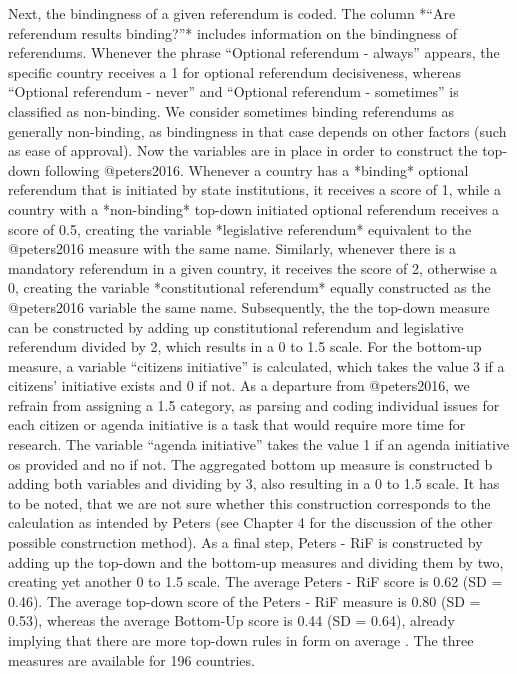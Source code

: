 \documentclass{systats}
\begin{document}
Next, the bindingness of a given referendum is coded. The column *“Are referendum results binding?”* includes information on the bindingness of referendums. Whenever the phrase “Optional referendum -  always” appears, the specific country receives a 1 for optional referendum decisiveness, whereas  “Optional referendum -  never” and “Optional referendum -  sometimes” is classified as non-binding. We consider sometimes binding referendums as generally non-binding, as bindingness in that case depends on other factors (such as ease of approval). Now the variables are in place in order to construct the top-down following @peters2016. Whenever a country has a *binding* optional referendum that is initiated by state institutions, it receives a score of 1, while a country with a *non-binding* top-down initiated optional referendum receives a score of 0.5, creating the variable *legislative referendum* equivalent to the @peters2016 measure with the same name. Similarly, whenever there is a mandatory referendum in a given country, it receives the score of 2, otherwise a 0, creating the variable *constitutional referendum*  equally constructed as the @peters2016 variable the same name. Subsequently, the the top-down measure can be constructed by adding up constitutional referendum and legislative referendum divided by 2, which results in a 0 to 1.5 scale.  
For the bottom-up measure, a variable “citizens initiative”  is calculated, which takes the value 3 if a citizens’ initiative exists and 0 if not. As a departure from @peters2016, we refrain from assigning a 1.5 category, as parsing and coding individual issues for each citizen or agenda initiative is a task that would require more time for research. The variable “agenda initiative” takes the value 1 if an agenda initiative os provided and no if not. The aggregated bottom up measure is constructed b adding both variables and dividing by 3, also resulting in a 0 to 1.5 scale. It has to be noted, that we are not sure whether this construction corresponds to the calculation as intended by Peters (see Chapter 4 for the discussion of the other possible construction method).
As a final step, Peters - RiF is constructed by adding up the top-down and the bottom-up measures and dividing them by two, creating yet another 0 to 1.5 scale. The average Peters - RiF score is 0.62 (SD = 0.46). The average top-down score of the Peters - RiF measure is 0.80 (SD = 0.53), whereas the average Bottom-Up score is 0.44 (SD = 0.64), already implying that there are more top-down rules in form on average . The three measures are available for 196 countries.
\end{document}
